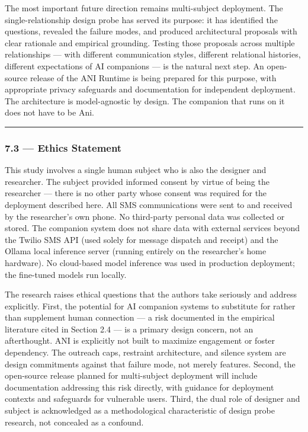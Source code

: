 \documentclass[12pt]{article}
\begin{document}
The most important future direction remains multi-subject deployment.
The single-relationship design probe has served its purpose: it has
identified the questions, revealed the failure modes, and produced
architectural proposals with clear rationale and empirical grounding.
Testing those proposals across multiple relationships --- with different
communication styles, different relational histories, different
expectations of AI companions --- is the natural next step. An
open-source release of the ANI Runtime is being prepared for this
purpose, with appropriate privacy safeguards and documentation for
independent deployment. The architecture is model-agnostic by design.
The companion that runs on it does not have to be Ani.

\begin{center}\rule{0.5\linewidth}{0.5pt}\end{center}

%
\subsubsection{7.3 --- Ethics Statement}\label{ethics-statement}

This study involves a single human subject who is also the designer and
researcher. The subject provided informed consent by virtue of being the
researcher --- there is no other party whose consent was required for
the deployment described here. All SMS communications were sent to and
received by the researcher's own phone. No third-party personal data was
collected or stored. The companion system does not share data with
external services beyond the Twilio SMS API (used solely for message
dispatch and receipt) and the Ollama local inference server (running
entirely on the researcher's home hardware). No cloud-based model
inference was used in production deployment; the fine-tuned models run
locally.

The research raises ethical questions that the authors take seriously
and address explicitly. First, the potential for AI companion systems to
substitute for rather than supplement human connection --- a risk
documented in the empirical literature cited in Section 2.4 --- is a
primary design concern, not an afterthought. ANI is explicitly not built
to maximize engagement or foster dependency. The outreach caps,
restraint architecture, and silence system are design commitments
against that failure mode, not merely features. Second, the open-source
release planned for multi-subject deployment will include documentation
addressing this risk directly, with guidance for deployment contexts and
safeguards for vulnerable users. Third, the dual role of designer and
subject is acknowledged as a methodological characteristic of design
probe research, not concealed as a confound.
\end{document}
